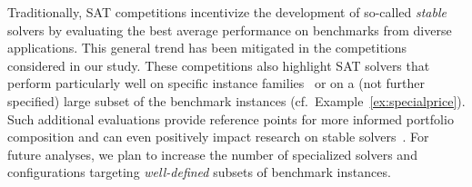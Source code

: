 \documentclass[a4paper,USenglish,pdfa]{lipics-v2021} %
\begin{document}
Traditionally, SAT competitions incentivize the development of so-called \emph{stable} solvers by evaluating the best average performance on benchmarks from diverse applications.
This general trend has been mitigated in the competitions considered in our study.
These competitions also highlight SAT solvers that perform particularly well on specific instance families~\cite{SC2020:AIJ} or on a (not further specified) large subset of the benchmark instances (cf.~Example~\ref{ex:specialprice}).
Such additional evaluations provide reference points for more informed portfolio composition and can even positively impact research on stable solvers~\cite{Fleury:2021:AllUip}.
For future analyses, we plan to increase the number of specialized solvers and configurations targeting \emph{well-defined} subsets of benchmark instances.


\end{document}
